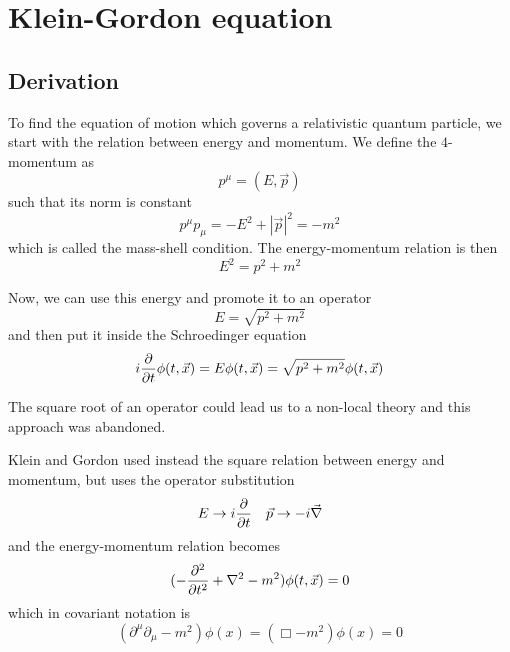 \part{Klein-Gordon equation}

\chapter{Derivation}

    To find the equation of motion which governs a relativistic quantum particle, we start with the relation between energy and momentum. We define the $4$-momentum as 
    \begin{equation*}
        p^\mu = (E, \vec p)
    \end{equation*}
    such that its norm is constant
    \begin{equation*}
        p^\mu p_\mu = - E^2 + |\vec p|^2 = - m^2
    \end{equation*}
    which is called the mass-shell condition. The energy-momentum relation is then
    \begin{equation}\label{enmom}
        E^2 = p^2 + m^2
    \end{equation}

    Now, we can use this energy and promote it to an operator
    \begin{equation*}
        E = \sqrt{p^2 + m^2}
    \end{equation*}
    and then put it inside the Schroedinger equation 
    \begin{equation*}
        i \frac{\partial}{\partial t} \phi(t, \vec x) = E \phi(t, \vec x) = \sqrt{p^2 + m^2} \phi(t, \vec x) 
    \end{equation*}

    The square root of an operator could lead us to a non-local theory and this approach was abandoned. 

    Klein and Gordon used instead the square relation between energy and momentum, but uses the operator substitution 
    \begin{equation}\label{sub}
        E \rightarrow i \frac{\partial}{\partial t} \quad \vec p \rightarrow - i \vec \nabla
    \end{equation}
    and the energy-momentum relation becomes 
    \begin{equation*}
        (- \frac{\partial^2 }{\partial t^2} + \nabla^2 - m^2) \phi(t, \vec x) = 0
    \end{equation*}
    which in covariant notation is 
    \begin{equation}\label{kgeq}
        (\partial^\mu \partial_\mu - m^2) \phi(x) = (\Box - m^2) \phi(x) = 0
    \end{equation}


